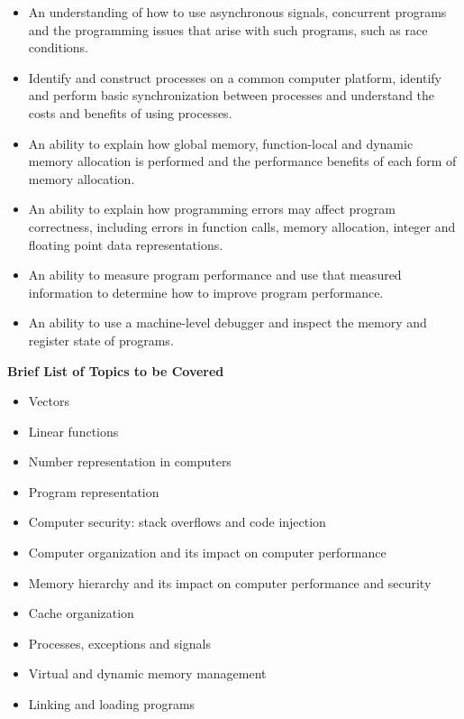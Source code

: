 \documentclass{article}
\begin{document}
\begin{itemize}
    \item An understanding of how to use asynchronous signals, concurrent programs and the programming issues that arise with such programs, such as race conditions.
    \item Identify and construct processes on a common computer platform, identify and perform basic synchronization between processes and understand the costs and benefits of using processes.
    \item An ability to explain how global memory, function-local and dynamic memory allocation is performed and the performance benefits of each form of memory allocation.
    \item An ability to explain how programming errors may affect program correctness, including errors in function calls, memory allocation, integer and floating point data representations.
    \item An ability to measure program performance and use that measured information to determine how to improve program performance.
    \item An ability to use a machine-level debugger and inspect the memory and register state of programs.
\end{itemize}

\noindent \textbf{Brief List of Topics to be Covered}
\begin{itemize}
    \item Vectors
    \item Linear functions
    \item Number representation in computers
    \item Program representation
    \item Computer security: stack overflows and code injection
    \item Computer organization and its impact on computer performance
    \item Memory hierarchy and its impact on computer performance and security
    \item Cache organization
    \item Processes, exceptions and signals
    \item Virtual and dynamic memory management
    \item Linking and loading programs
\end{itemize}
\end{document}
